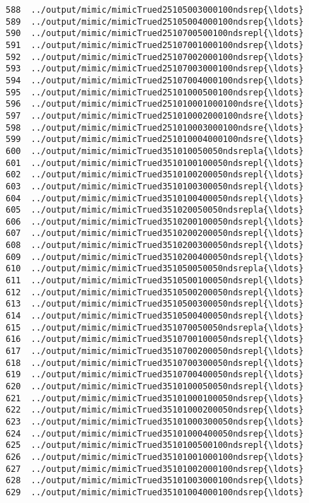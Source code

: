 \documentclass[11pt]{article}
\begin{document}
\begin{Verbatim}[commandchars=\\\{\}]
588  ../output/mimic/mimicTrued25105003000100ndsrep{\ldots}  
589  ../output/mimic/mimicTrued25105004000100ndsrep{\ldots}  
590  ../output/mimic/mimicTrued2510700500100ndsrepl{\ldots}  
591  ../output/mimic/mimicTrued25107001000100ndsrep{\ldots}  
592  ../output/mimic/mimicTrued25107002000100ndsrep{\ldots}  
593  ../output/mimic/mimicTrued25107003000100ndsrep{\ldots}  
594  ../output/mimic/mimicTrued25107004000100ndsrep{\ldots}  
595  ../output/mimic/mimicTrued25101000500100ndsrep{\ldots}  
596  ../output/mimic/mimicTrued251010001000100ndsre{\ldots}  
597  ../output/mimic/mimicTrued251010002000100ndsre{\ldots}  
598  ../output/mimic/mimicTrued251010003000100ndsre{\ldots}  
599  ../output/mimic/mimicTrued251010004000100ndsre{\ldots}  
600  ../output/mimic/mimicTrued351010050050ndsrepla{\ldots}  
601  ../output/mimic/mimicTrued3510100100050ndsrepl{\ldots}  
602  ../output/mimic/mimicTrued3510100200050ndsrepl{\ldots}  
603  ../output/mimic/mimicTrued3510100300050ndsrepl{\ldots}  
604  ../output/mimic/mimicTrued3510100400050ndsrepl{\ldots}  
605  ../output/mimic/mimicTrued351020050050ndsrepla{\ldots}  
606  ../output/mimic/mimicTrued3510200100050ndsrepl{\ldots}  
607  ../output/mimic/mimicTrued3510200200050ndsrepl{\ldots}  
608  ../output/mimic/mimicTrued3510200300050ndsrepl{\ldots}  
609  ../output/mimic/mimicTrued3510200400050ndsrepl{\ldots}  
610  ../output/mimic/mimicTrued351050050050ndsrepla{\ldots}  
611  ../output/mimic/mimicTrued3510500100050ndsrepl{\ldots}  
612  ../output/mimic/mimicTrued3510500200050ndsrepl{\ldots}  
613  ../output/mimic/mimicTrued3510500300050ndsrepl{\ldots}  
614  ../output/mimic/mimicTrued3510500400050ndsrepl{\ldots}  
615  ../output/mimic/mimicTrued351070050050ndsrepla{\ldots}  
616  ../output/mimic/mimicTrued3510700100050ndsrepl{\ldots}  
617  ../output/mimic/mimicTrued3510700200050ndsrepl{\ldots}  
618  ../output/mimic/mimicTrued3510700300050ndsrepl{\ldots}  
619  ../output/mimic/mimicTrued3510700400050ndsrepl{\ldots}  
620  ../output/mimic/mimicTrued3510100050050ndsrepl{\ldots}  
621  ../output/mimic/mimicTrued35101000100050ndsrep{\ldots}  
622  ../output/mimic/mimicTrued35101000200050ndsrep{\ldots}  
623  ../output/mimic/mimicTrued35101000300050ndsrep{\ldots}  
624  ../output/mimic/mimicTrued35101000400050ndsrep{\ldots}  
625  ../output/mimic/mimicTrued3510100500100ndsrepl{\ldots}  
626  ../output/mimic/mimicTrued35101001000100ndsrep{\ldots}  
627  ../output/mimic/mimicTrued35101002000100ndsrep{\ldots}  
628  ../output/mimic/mimicTrued35101003000100ndsrep{\ldots}  
629  ../output/mimic/mimicTrued35101004000100ndsrep{\ldots}  

\end{Verbatim}
\end{document}
